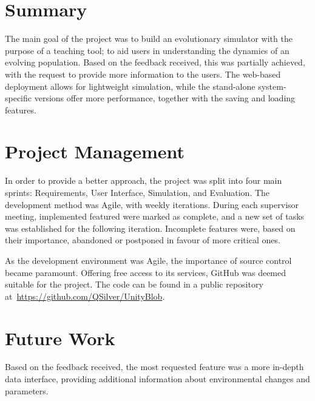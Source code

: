 \section{Summary}

The main goal of the project was to build an evolutionary simulator with the purpose of a teaching tool; to aid users in understanding the dynamics of an evolving population. Based on the feedback received, this was partially achieved, with the request to provide more information to the users.
The web-based deployment allows for lightweight simulation, while the stand-alone system-specific versions offer more performance, together with the saving and loading features.

\section{Project Management} \label{projmgmt}

In order to provide a better approach, the project was split into four main sprints: Requirements, User Interface, Simulation, and Evaluation. The development method was Agile, with weekly iterations. During each supervisor meeting, implemented featured were marked as complete, and a new set of tasks was established for the following iteration. Incomplete features were, based on their importance, abandoned or postponed in favour of more critical ones.

As the development environment was Agile, the importance of source control became paramount. Offering free access to its services, GitHub was deemed suitable for the project. The code can be found in a public repository at~\url{https://github.com/QSilver/UnityBlob}.

\section{Future Work}

Based on the feedback received, the most requested feature was a more in-depth data interface, providing additional information about environmental changes and parameters.

